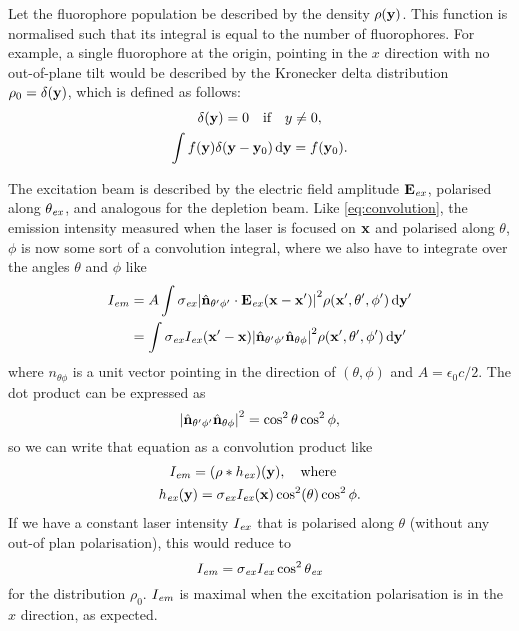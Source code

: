 Let the fluorophore population be described by the density $ \rho(\vb{y}) $. This function is normalised such that its integral is equal to the number of fluorophores. For example, a single fluorophore at the origin, pointing in the $ x $ direction with no out-of-plane tilt would be described by the Kronecker delta distribution $ \rho_0 = \delta(\vb{y}) $, which is defined as follows:
\begin{gather}
	\delta(\vb{y}) = 0 \qq{if} y\neq0, \\
	\int f(\vb{y})\delta(\vb{y}-\vb{y}_0) \dd{\vb{y}} = f(\vb{y}_0).
\end{gather}

The excitation beam is described by the electric field amplitude $ \vb{E}_{\mathit{ex}} $, polarised along $ \theta_{\mathit{ex}} $, and analogous for the depletion beam. Like \autoref{eq:convolution}, the emission intensity measured when the laser is focused on $ \vb{x} $ and polarised along $ \theta $, $ \phi $ is now some sort of a convolution integral, where we also have to integrate over the angles $ \theta $ and $ \phi $ like
\begin{equation}
	\begin{aligned}
		I_{\mathit{em}} 
			&= A \int 
				\sigma_{\mathit{ex}} \abs{\hat{\vb{n}}_{\theta'\phi'} \cdot \vb{E}_{\mathit{ex}}(\vb{x}-\vb{x}')}^2 
				\rho(\vb{x}', \theta', \phi') 
				\dd{\vb{y}'} \\
			&= \int 
				\sigma_{\mathit{ex}} I_{\mathit{ex}}(\vb{x}'-\vb{x}) \abs{\hat{\vb{n}}_{\theta'\phi'}\hat{\vb{n}}_{\theta\phi}}^2
				\rho(\vb{x}', \theta', \phi') 
				\dd{\vb{y}'}
	\end{aligned}
\end{equation}
where $ \unit{n}_{\theta\phi} $ is a unit vector pointing in the direction of $ (\theta, \phi) $ and $ A = \epsilon_0c/2 $. The dot product can be expressed as
\begin{equation}
	\abs{\hat{\vb{n}}_{\theta'\phi'}\hat{\vb{n}}_{\theta\phi}}^2 = \cos^2\theta \cos^2\phi,
\end{equation}
so we can write that equation as a convolution product like
\begin{gather}
	I_\emm = (\rho*h_\exc)(\vb{y}),\qq{where} \\
	h_\exc(\vb{y}) = \sigma_\exc I_\exc(\vb{x}) \cos^2(\theta)\cos^2\phi.
\end{gather}
If we have a constant laser intensity $ I_{\mathit{ex}} $ that is polarised along $ \theta $ (without any out-of plan polarisation), this would reduce to
\begin{equation}
	I_{\mathit{em}} = \sigma_{\mathit{ex}} I_{\mathit{ex}} \cos^2\theta_{\mathit{ex}}
\end{equation}
for the distribution $ \rho_0 $. $ I_{\mathit{em}} $ is maximal when the excitation polarisation is in the $ x $ direction, as expected.

